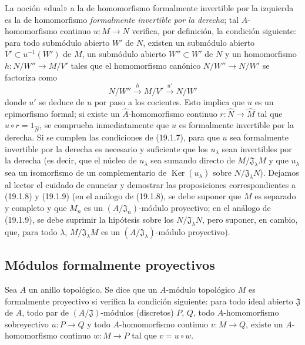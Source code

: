 \begin{remark}[19.1.15]
\label{0.19.1.15-fr}
La noción «dual» a la de homomorfismo formalmente invertible por la izquierda
es la de homomorfismo \emph{formalmente invertible por la derecha}; tal
$A$-homomorfismo continuo $u:M\to N$ verifica, por definición, la condición
siguiente: para todo submódulo abierto $W'$ de $N$, existen un submódulo
abierto $V'\subset u^{-1}(W')$ de $M$, un submódulo abierto $W''\subset W'$ de
$N$ y un homomorfismo $h:N/W''\to M/V'$ tales que el homomorfismo canónico
$N/W''\to N/W'$ se factoriza como
\[
  N/W''\xrightarrow{h}M/V'\xrightarrow{u'}N/W'
\]
donde $u'$ se deduce de $u$ por paso a los cocientes. Esto implica que $u$ es
un epimorfismo formal; si existe un $\widehat A$-homomorfismo continuo
$r:\widehat N\to\widehat M$ tal que $\widehat u\circ r=1_{\widehat N}$, se
comprueba inmediatamente que $u$ es formalmente invertible por la derecha. Si
se cumplen las condiciones de (19.1.7), para que $u$ sea formalmente invertible
por la derecha es necesario y suficiente que los $u_\lambda$ sean invertibles
por la derecha (es decir, que el núcleo de $u_\lambda$ sea sumando directo de
$M/\mathfrak J_\lambda M$ y que $u_\lambda$ sea un isomorfismo de un
complementario de $\operatorname{Ker}(u_\lambda)$ sobre
$N/\mathfrak J_\lambda N$). Dejamos al lector el cuidado de enunciar y
demostrar las proposiciones correspondientes a (19.1.8) y (19.1.9) (en el
análogo de (19.1.8), se debe suponer que $M$ es separado y completo y que $M_n$
es un $(A/\mathfrak J_n)$-módulo proyectivo; en el análogo de (19.1.9), se debe
suprimir la hipótesis sobre los $N/\mathfrak J_\lambda N$, pero suponer, en
cambio, que, para todo $\lambda$, $M/\mathfrak J_\lambda M$ es un
$(A/\mathfrak J_\lambda)$-módulo proyectivo).
\end{remark}

\subsection{Módulos formalmente proyectivos}
\label{subsection:0.19.2-fr}

\begin{definition}[19.2.1]
\label{0.19.2.1-fr}
Sea $A$ un anillo topológico. Se dice que un $A$-módulo topológico $M$ es
formalmente proyectivo si verifica la condición siguiente: para todo
ideal abierto $\mathfrak J$ de $A$, todo par de $(A/\mathfrak J)$-módulos
(discretos) $P$, $Q$, todo $A$-homomorfismo sobreyectivo $u:P\to Q$ y todo
$A$-homomorfismo continuo $v:M\to Q$, existe un $A$-homomorfismo continuo
$w:M\to P$ tal que $v=u\circ w$.
\end{definition}

